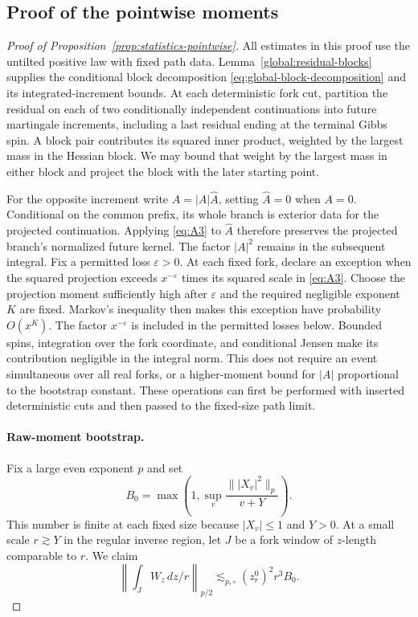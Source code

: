 \subsection{Proof of the pointwise moments}
\begin{proof}[Proof of Proposition~\ref{prop:statistics-pointwise}]
All estimates in this proof use the untilted positive law with fixed
path data. Lemma~\ref{global:residual-blocks} supplies the conditional
block decomposition \eqref{eq:global-block-decomposition} and its
integrated-increment bounds. At each deterministic fork cut,
partition the residual on each of two conditionally independent
continuations into future martingale increments, including a last residual ending at the terminal
Gibbs spin. A block pair contributes its squared inner product,
weighted by the largest mass in the Hessian block. We may bound that
weight by the largest mass in either block and project the block with
the later starting point.

For the opposite increment write $A=|A|\widehat A$, setting
$\widehat A=0$ when $A=0$. Conditional on the common prefix, its
whole branch is exterior data for the projected continuation. Applying
\eqref{eq:A3} to $\widehat A$ therefore preserves the projected
branch's normalized future kernel. The factor $|A|^2$ remains in the
subsequent integral. Fix a permitted loss $\varepsilon>0$. At each
fixed fork, declare an exception when the squared projection exceeds
$x^{-\varepsilon}$ times its squared scale in \eqref{eq:A3}.
Choose the projection moment sufficiently high after $\varepsilon$
and the required negligible exponent $K$ are fixed. Markov's
inequality then makes this exception have probability $O(x^K)$.
The factor $x^{-\varepsilon}$ is included in the permitted losses
below. Bounded spins,
integration over the fork coordinate, and conditional Jensen make its
contribution negligible in the integral norm. This does not require an
event simultaneous over all real forks, or a higher-moment bound for
$|A|$ proportional to the bootstrap constant. These operations can
first be performed with inserted deterministic cuts and then passed to
the fixed-size path limit.

\paragraph{Raw-moment bootstrap.}
Fix a large even exponent $p$ and set
\[
 B_0=\max\left(1,\sup_v\frac{\||X_v|^2\|_p}{v+Y}\right).
\]
This number is finite at each fixed size because $|X_v|\le1$ and
$Y>0$. At a small scale $r\gtrsim Y$ in the regular inverse region,
let $J$ be a fork window of $z$-length comparable to $r$. We claim
\begin{equation}
 \left\|\int_J W_z\,dz/r\right\|_{p/2}
 \lesssim_{p,\circ}(z_r^0)^2r^3B_0.
 \tag{D6}\label{eq:D6}
\end{equation}


\end{proof}
